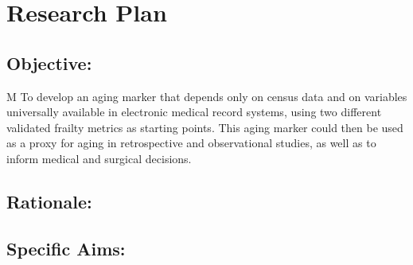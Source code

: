 \section{Research Plan }\label{research-plan}


\subsection{Objective:}\label{objective}
  

M
To develop an aging marker\cite{Orkaby_2017} that depends only on census data and on
variables universally available in electronic medical record systems,
using two different validated frailty metrics as starting points. This
aging marker could then be used as a proxy for aging in retrospective
and observational studies, as well as to inform medical and surgical
decisions.


\subsection{Rationale:}\label{rationale}

\subsection{Specific Aims:}\label{specific-aims}

